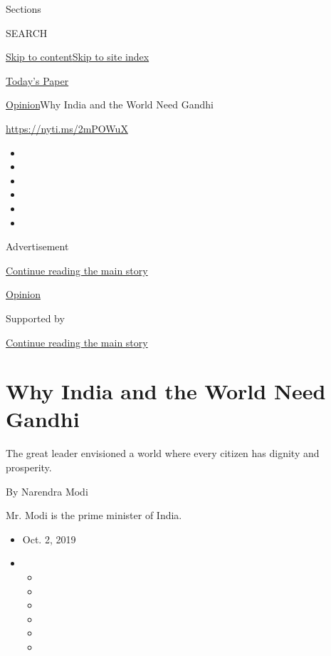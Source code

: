Sections

SEARCH

\protect\hyperlink{site-content}{Skip to
content}\protect\hyperlink{site-index}{Skip to site index}

\href{https://myaccount.nytimes3xbfgragh.onion/auth/login?response_type=cookie\&client_id=vi}{}

\href{https://www.nytimes3xbfgragh.onion/section/todayspaper}{Today's
Paper}

\href{/section/opinion}{Opinion}\textbar{}Why India and the World Need
Gandhi

\url{https://nyti.ms/2mPOWuX}

\begin{itemize}
\item
\item
\item
\item
\item
\item
\end{itemize}

Advertisement

\protect\hyperlink{after-top}{Continue reading the main story}

\href{/section/opinion}{Opinion}

Supported by

\protect\hyperlink{after-sponsor}{Continue reading the main story}

\hypertarget{why-india-and-the-world-need-gandhi}{%
\section{Why India and the World Need
Gandhi}\label{why-india-and-the-world-need-gandhi}}

The great leader envisioned a world where every citizen has dignity and
prosperity.

By Narendra Modi

Mr. Modi is the prime minister of India.

\begin{itemize}
\item
  Oct. 2, 2019
\item
  \begin{itemize}
  \item
  \item
  \item
  \item
  \item
  \item
  \end{itemize}
\end{itemize}

